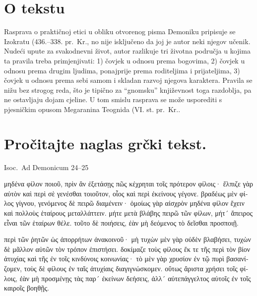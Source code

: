


\section*{O tekstu}

Rasprava o praktičnoj etici u obliku otvorenog pisma Demoniku pripisuje se Izokratu (436.–338. pr.~Kr., no nije isključeno da joj je autor neki njegov učenik. Nudeći upute za svakodnevni život, autor razlikuje tri životna područja u kojima ta pravila treba primjenjivati: 1) čovjek u odnosu prema bogovima, 2) čovjek u odnosu prema drugim ljudima, ponajprije prema roditeljima i prijateljima, 3) čovjek u odnosu prema sebi samom i skladan razvoj njegova karaktera. Pravila se nižu bez strogog reda, što je tipično za ``gnomsku'' književnost toga razdoblja, pa ne ostavljaju dojam cjeline. U tom smislu rasprava se može usporediti s pjesničkim opusom Megaranina Teognida (VI. st. pr.~Kr..


\section*{Pročitajte naglas grčki tekst.}

Isoc.\ Ad Demonicum 24–25


\medskip


{\large

\begin{greek}

\noindent μηδένα φίλον ποιοῦ, πρὶν ἂν ἐξετάσῃς πῶς κέχρηται τοῖς πρότερον φίλοις· ἔλπιζε γὰρ αὐτὸν καὶ περὶ σὲ γενέσθαι τοιοῦτον, οἷος καὶ περὶ ἐκείνους γέγονε. βραδέως μὲν φίλος γίγνου, γενόμενος δὲ πειρῶ διαμένειν· ὁμοίως γὰρ αἰσχρὸν μηδένα φίλον ἔχειν καὶ πολλοὺς ἑταίρους μεταλλάττειν. μήτε μετὰ βλάβης πειρῶ τῶν φίλων, μήτ´ ἄπειρος εἶναι τῶν ἑταίρων θέλε. τοῦτο δὲ ποιήσεις, ἐὰν μὴ δεόμενος τὸ δεῖσθαι προσποιῇ.

\noindent περὶ τῶν ῥητῶν ὡς ἀπορρήτων ἀνακοινοῦ· μὴ τυχὼν μὲν γὰρ οὐδὲν βλαβήσει, τυχὼν δὲ μᾶλλον αὐτῶν τὸν τρόπον ἐπιστήσει. δοκίμαζε τοὺς φίλους ἔκ τε τῆς περὶ τὸν βίον ἀτυχίας καὶ τῆς ἐν τοῖς κινδύνοις κοινωνίας· τὸ μὲν γὰρ χρυσίον ἐν τῷ πυρὶ βασανίζομεν, τοὺς δὲ φίλους ἐν ταῖς ἀτυχίαις διαγιγνώσκομεν. οὕτως ἄριστα χρήσει τοῖς φίλοις, ἐὰν μὴ προσμένῃς τὰς παρ´ ἐκείνων δεήσεις, ἀλλ´ αὐτεπάγγελτος αὐτοῖς ἐν τοῖς καιροῖς βοηθῇς.

\end{greek}

}



